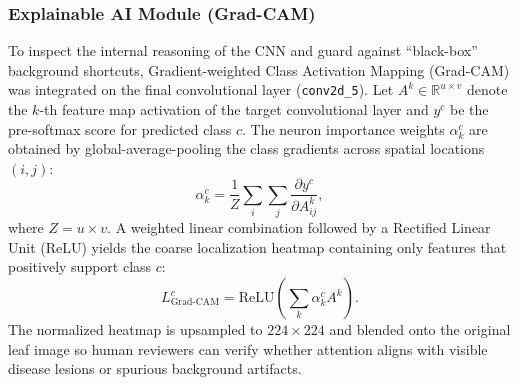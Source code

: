 \subsubsection{Explainable AI Module (Grad-CAM)}
To inspect the internal reasoning of the CNN and guard against ``black-box'' background shortcuts, Gradient-weighted Class Activation Mapping (Grad-CAM) \cite{selvaraju2017grad} was integrated on the final convolutional layer (\texttt{conv2d\_5}). Let $A^k \in \mathbb{R}^{u \times v}$ denote the $k$-th feature map activation of the target convolutional layer and $y^c$ be the pre-softmax score for predicted class $c$. The neuron importance weights $\alpha_k^c$ are obtained by global-average-pooling the class gradients across spatial locations $(i, j)$:
\begin{equation}
\alpha_k^c = \frac{1}{Z} \sum_{i} \sum_{j} \frac{\partial y^c}{\partial A_{ij}^k},
\end{equation}
where $Z = u \times v$. A weighted linear combination followed by a Rectified Linear Unit ($\text{ReLU}$) yields the coarse localization heatmap containing only features that positively support class $c$:
\begin{equation}
L_{\text{Grad-CAM}}^c = \text{ReLU}\!\left(\sum_{k} \alpha_k^c A^k\right).
\end{equation}
The normalized heatmap is upsampled to $224 \times 224$ and blended onto the original leaf image so human reviewers can verify whether attention aligns with visible disease lesions or spurious background artifacts.

